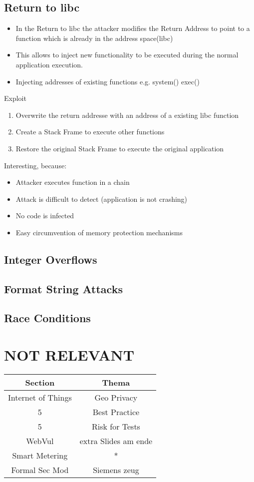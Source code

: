 \documentclass[a4paper, 12pt]{article}
\begin{document}
\subsection{Return to libc}
\begin{itemize}
\item In the Return to libc the attacker modifies the Return Address to point to a function which is already in the address space(libc)
\item This allows to inject new functionality to be executed during the normal application execution.
\item Injecting addresses of existing functions e.g. system() exec()
\end{itemize}
Exploit
\begin{enumerate}
\item Overwrite the return addresse with an address of a existing libc function
\item Create a Stack Frame to execute other functions
\item Restore the original Stack Frame to execute the original application
\end{enumerate}
Interesting, because:
\begin{itemize}
\item Attacker executes function in a chain
\item Attack is difficult to detect (application is not crashing)
\item No code is infected
\item Easy circumvention of memory protection mechanisms
\end{itemize}

\subsection{Integer Overflows}
\subsection{Format String Attacks}
\subsection{Race Conditions}

\section{NOT RELEVANT}
\begin{tabular}{|c|c|} \hline
\textbf{Section} & \textbf{Thema} \\ \hline
Internet of Things & Geo Privacy \\ \hline
5 & Best Practice \\ \hline
5 & Risk for Tests \\ \hline
WebVul & extra Slides am ende \\ \hline
Smart Metering & * \\ \hline
Formal Sec Mod & Siemens zeug \\ \hline



\end{tabular}
\end{document}
